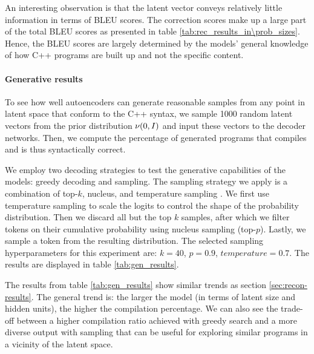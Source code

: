 An interesting observation is that the latent vector conveys relatively little information in terms of BLEU scores. The correction scores make up a large part of the total BLEU scores as presented in table \ref{tab:rec_results_in\prob_sizes}. Hence, the BLEU scores are largely determined by the models' general knowledge of how C++ programs are built up and not the specific content.

\paragraph{Generative results}
\label{results:gen}
To see how well autoencoders can generate reasonable samples from any point in latent space that conform to the C++ syntax, we sample 1000 random latent vectors from the prior distribution $\nu(0, I)$ and input these vectors to the decoder networks. Then, we compute the percentage of generated programs that compiles and is thus syntactically correct.



We employ two decoding strategies to test the generative capabilities of the models: greedy decoding and sampling. The sampling strategy we apply is a combination of top-$k$, nucleus, and temperature sampling \cite{holtzmanCuriousCaseNeural2019}. 
We first use temperature sampling to scale the logits to control the shape of the probability distribution. Then we discard all but the top $k$ samples, after which we filter tokens on their cumulative probability using nucleus sampling (top-$p$). Lastly, we sample a token from the resulting distribution. The selected sampling hyperparameters for this experiment are: $k=40$, $p=0.9$, $temperature=0.7$. The results are displayed in table \ref{tab:gen_results}.

\begin{table}
\centering

\caption{Generative results compilation percentage.}
\label{tab:gen_results}
\end{table}




The results from table \ref{tab:gen_results} show similar trends as section \ref{sec:recon-results}. 
The general trend is: the larger the model (in terms of latent size and hidden units), the higher the compilation percentage. 
We can also see the trade-off between a higher compilation ratio achieved with greedy search and a more diverse output with sampling that can be useful for exploring similar programs in a vicinity of the latent space.

